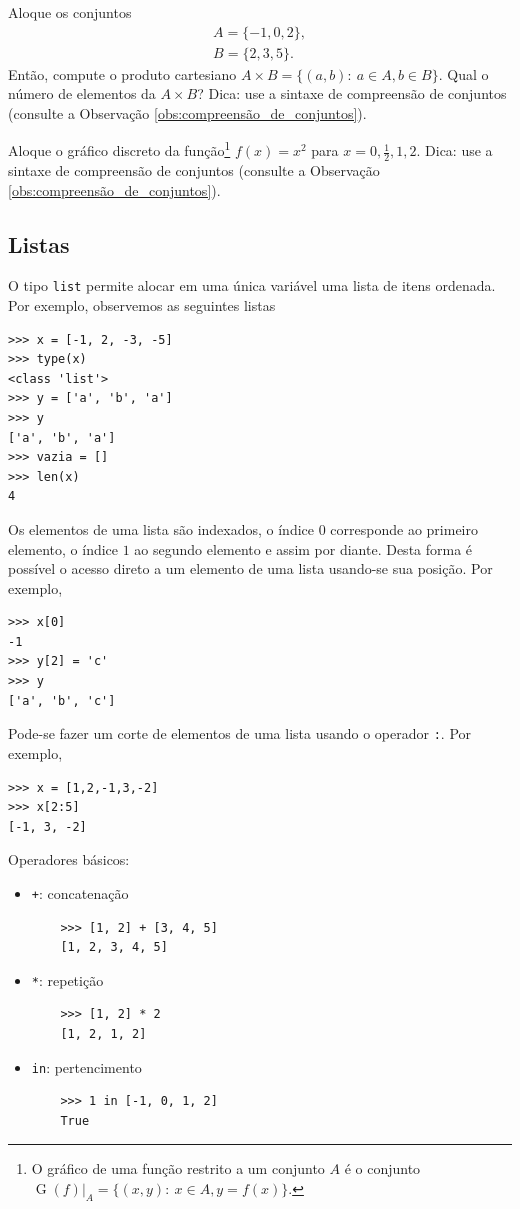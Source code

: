 \documentclass[12pt]{article}
\begin{document}
\begin{exr}
  Aloque os conjuntos
  \begin{gather}
    A = \{-1, 0, 2\},\\
    B = \{2, 3, 5\}.
  \end{gather}
  Então, compute o produto cartesiano $A\times B=\{(a,b):~a\in A, b\in B\}$. Qual o número de elementos da $A\times B$? Dica: use a sintaxe de compreensão de conjuntos (consulte a Observação \ref{obs:compreensão_de_conjuntos}).
\end{exr}

\begin{exr}
  Aloque o gráfico discreto da função\footnote{O gráfico de uma função restrito a um conjunto $A$ é o conjunto $\operatorname{G}(f)|_{A} = \{(x,y):~x\in A, y=f(x)\}$.} $f(x) = x^2$ para $x=0, \frac{1}{2}, 1, 2$. Dica: use a sintaxe de compreensão de conjuntos (consulte a Observação \ref{obs:compreensão_de_conjuntos}).
\end{exr}

\subsection{Listas}

O tipo {\python} \lstinline+list+ permite alocar em uma única variável uma lista de itens ordenada. Por exemplo, observemos as seguintes listas
\begin{lstlisting}
>>> x = [-1, 2, -3, -5]
>>> type(x)
<class 'list'>
>>> y = ['a', 'b', 'a']
>>> y
['a', 'b', 'a']
>>> vazia = []
>>> len(x)
4
\end{lstlisting}

Os elementos de uma lista são indexados, o índice $0$ corresponde ao primeiro elemento, o índice $1$ ao segundo elemento e assim por diante. Desta forma é possível o acesso direto a um elemento de uma lista usando-se sua posição. Por exemplo,
\begin{lstlisting}
>>> x[0]
-1
>>> y[2] = 'c'
>>> y
['a', 'b', 'c']
\end{lstlisting}
Pode-se fazer um corte de elementos de uma lista usando o operador \lstinline+:+. Por exemplo,
\begin{lstlisting}
>>> x = [1,2,-1,3,-2]
>>> x[2:5]
[-1, 3, -2]
\end{lstlisting}

Operadores básicos:
\begin{itemize}
\item[] \lstinline-+-: concatenação
  \begin{lstlisting}
    >>> [1, 2] + [3, 4, 5]
    [1, 2, 3, 4, 5]
  \end{lstlisting}
\item[] \lstinline+*+: repetição
  \begin{lstlisting}
    >>> [1, 2] * 2
    [1, 2, 1, 2]
  \end{lstlisting}
\item[] \lstinline+in+: pertencimento
  \begin{lstlisting}
    >>> 1 in [-1, 0, 1, 2]
    True
  \end{lstlisting}
\end{itemize}
\end{document}
